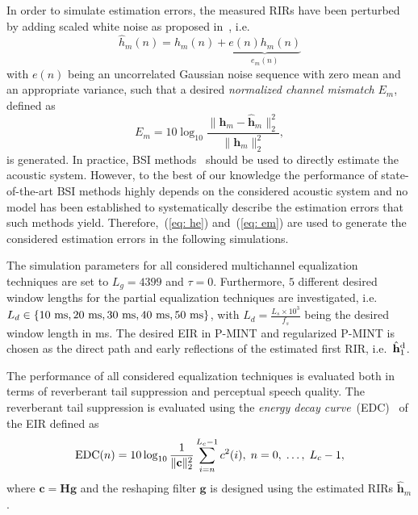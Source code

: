 \documentclass[10pt]{IEEEtran}
\begin{document}
In order to simulate estimation errors, the measured RIRs have been perturbed by adding scaled white noise as proposed in~\cite{Cho_ITSA_1999}, i.e.
\begin{equation}
  \label{eq: he}
  \hat{h}_m(n) = h_m(n) + \underbrace{e(n)h_m(n)}_{e_m(n)}
\end{equation}
with $e(n)$ being an uncorrelated Gaussian noise sequence with zero mean and an appropriate variance, such that a desired \emph{normalized channel mismatch} $E_m$, defined as
\begin{equation}
  \label{eq: em}
E_m = 10 \log_{10} \frac{\|\mathbf{h}_m - \hat{\mathbf{h}}_m \|_2^2}{\|\mathbf{h}_m\|_2^2},
\end{equation}
is generated.
In practice, BSI methods~\cite{Hasan_EUSIPCO_2006,Haque_ITASLP_2011} should be used to directly estimate the acoustic system. 
However, to the best of our knowledge the performance of state-of-the-art BSI methods highly depends on the considered acoustic system and no model has been established to systematically describe the estimation errors that such methods yield.
Therefore,~(\ref{eq: he}) and~(\ref{eq: em}) are used to generate the considered estimation errors in the following simulations.

The simulation parameters for all considered multichannel equalization techniques are set to  $L_g = 4399$ and $\tau = 0$.
Furthermore, $5$ different desired window lengths for the partial equalization techniques are investigated, i.e. $L_d \in \{ 10~{\rm ms}, 20~{\rm ms}, 30~{\rm ms}, 40~{\rm ms}, 50~{\rm ms} \}$, with $L_d = \frac{L_s \times 10^3}{f_s}$ being the desired window length in ms.
The desired EIR in P-MINT and regularized P-MINT is chosen as the direct path and early reflections of the estimated first RIR, i.e.~$\hat{\mathbf{h}}_1^{\rm d}$.

The performance of all considered equalization techniques is evaluated both in terms of reverberant tail suppression and perceptual speech quality.
The reverberant tail suppression is evaluated using the \emph{energy decay curve}~(EDC)~\cite{Naylor_Derev_book} of the EIR defined as
\begin{equation}
{\rm EDC}(n) = 10 \log_{10} \frac{1}{\|\mathbf{c}\|_2^2} \sum_{i = n}^{L_c-1} c^2(i), \; n =0, \; \ldots, \; L_c-1,
\end{equation}
where $\mathbf{c} = \mathbf{H}\mathbf{g}$ and the reshaping filter $\mathbf{g}$ is designed using the estimated RIRs $\hat{\mathbf{h}}_m$.
\end{document}
